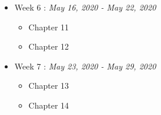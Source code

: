 \documentclass[11pt]{article}
\theoremstyle{definition}
\theoremstyle{remark}
\begin{document}
\begin{itemize}
	\item Week 6 : \textit{May 16, 2020 - May 22, 2020}
	\begin{itemize}
		\itemsep-1mm
		\item Chapter 11
		\item Chapter 12
	\end{itemize}
\end{itemize}

\begin{itemize}
	\item Week 7 : \textit{May 23, 2020 - May 29, 2020}
	\begin{itemize}
		\itemsep-1mm
		\item Chapter 13
		\item Chapter 14
	\end{itemize}
\end{itemize}
\fi

\medskip
{}


\end{document}
